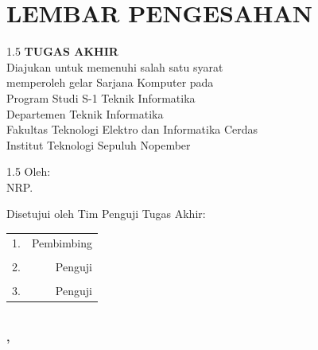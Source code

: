 \chapter*{LEMBAR PENGESAHAN}

\thispagestyle{empty}

\vspace{3ex}

\begin{center}
	\textbf{\tatitle{}}
\end{center}

\vspace{1ex}

\begingroup

\begin{center}
	\begin{spacing}{1.5}
		\textbf{TUGAS AKHIR} \\
		\vspace{1ex}
		Diajukan untuk memenuhi salah satu syarat \\
		memperoleh gelar Sarjana Komputer pada \\
		Program Studi S-1 Teknik Informatika \\
		Departemen Teknik Informatika \\
		Fakultas Teknologi Elektro dan Informatika Cerdas \\
		Institut Teknologi Sepuluh Nopember
	\end{spacing}

	\vspace{2ex}

	\begin{spacing}{1.5}
		Oleh: \MakeUppercase{\textbf{\name{}}} \\
		NRP. \nrp{}
	\end{spacing}

	\vspace{3ex}

	Disetujui oleh Tim Penguji Tugas Akhir:
\end{center}

\endgroup

\vspace{3ex}

\begingroup
\setlength{\tabcolsep}{0pt}
\noindent
\begin{tabularx}{\textwidth}{@{} X r @{}}
	1. \advisor{}
	& Pembimbing \\
	\\[3ex]
	2. \examinerone{}
	& Penguji \\
	\\[3ex]
	3. \examinertwo{}
	& Penguji \\
\end{tabularx}
\endgroup

\vspace{\fill}

\begin{center}
	\textbf{\MakeUppercase{\place{}}\\\MONTH{}, \the\year{}}
\end{center}
